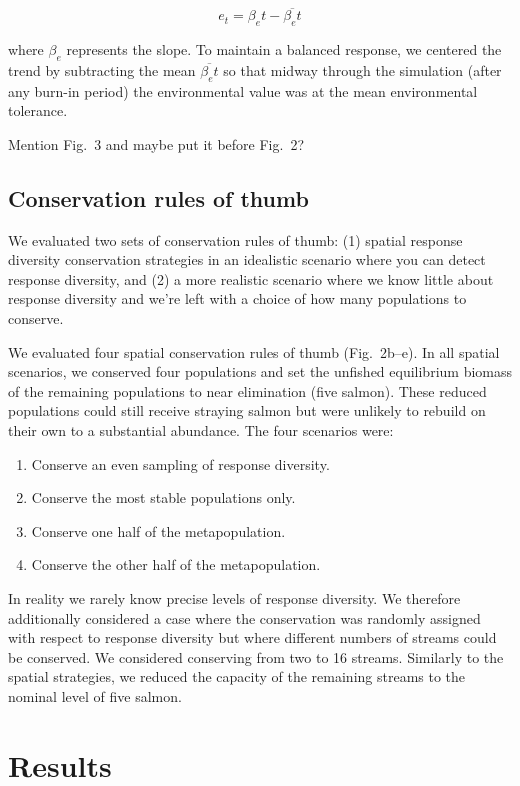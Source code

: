 \[e_t = \beta_e t - \overline{\beta_e t}\]

\noindent where $\beta_e$ represents the slope. To maintain a balanced response, we centered the trend by subtracting the mean $\overline{\beta_e t}$ so that midway through the simulation (after any burn-in period) the environmental value was at the mean environmental tolerance.

Mention Fig.~3 and maybe put it before Fig.~2?

\subsection{Conservation rules of thumb}

We evaluated two sets of conservation rules of thumb: (1) spatial response diversity conservation strategies in an idealistic scenario where you can detect response diversity, and (2) a more realistic scenario where we know little about response diversity and we're left with a choice of how many populations to conserve.

We evaluated four spatial conservation rules of thumb (Fig.~2b--e). In all spatial scenarios, we conserved four populations and set the unfished equilibrium biomass of the remaining populations to near elimination (five salmon). These reduced populations could still receive straying salmon but were unlikely to rebuild on their own to a substantial abundance. The four scenarios were:

\begin{enumerate}
\def\labelenumi{\arabic{enumi}.}
\itemsep1pt\parskip0pt
\item
  Conserve an even sampling of response diversity.
\item
  Conserve the most stable populations only.
\item
  Conserve one half of the metapopulation.
\item
  Conserve the other half of the metapopulation.
\end{enumerate}

In reality we rarely know precise levels of response diversity. We therefore additionally considered a case where the conservation was randomly assigned with respect to response diversity but where different numbers of streams could be conserved. We considered conserving from two to 16 streams. Similarly to the spatial strategies, we reduced the capacity of the remaining streams to the nominal level of five salmon.

\section{Results}

